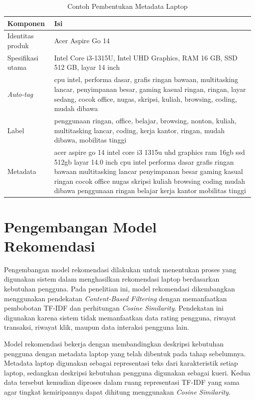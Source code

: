 \begin{table}[htbp]
\centering
\footnotesize
\caption{Contoh Pembentukan Metadata Laptop}
\label{tab:contoh_metadata_bab3}
\renewcommand{\arraystretch}{1.15}
\begin{tabular}{|p{4cm}|p{9cm}|}
\hline
\textbf{Komponen} & \textbf{Isi} \\ \hline
Identitas produk & Acer Aspire Go 14 \\ \hline
Spesifikasi utama & Intel Core i3-1315U, Intel UHD Graphics, RAM 16 GB, SSD 512 GB, layar 14 inch \\ \hline
\textit{Auto-tag} & cpu intel, performa dasar, grafis ringan bawaan, multitasking lancar, penyimpanan besar, gaming kasual ringan, ringan, layar sedang, cocok office, nugas, skripsi, kuliah, browsing, coding, mudah dibawa \\ \hline
Label & penggunaan ringan, office, belajar, browsing, nonton, kuliah, multitasking lancar, coding, kerja kantor, ringan, mudah dibawa, mobilitas tinggi \\ \hline
Metadata & acer aspire go 14 intel core i3 1315u uhd graphics ram 16gb ssd 512gb layar 14.0 inch cpu intel performa dasar grafis ringan bawaan multitasking lancar penyimpanan besar gaming kasual ringan cocok office nugas skripsi kuliah browsing coding mudah dibawa penggunaan ringan belajar kerja kantor mobilitas tinggi \\ \hline
\end{tabular}
\end{table}

\section{Pengembangan Model Rekomendasi}
Pengembangan model rekomendasi dilakukan untuk menentukan proses yang digunakan sistem dalam menghasilkan rekomendasi laptop berdasarkan kebutuhan pengguna. Pada penelitian ini, model rekomendasi dikembangkan menggunakan pendekatan \textit{Content-Based Filtering} dengan memanfaatkan pembobotan TF-IDF dan perhitungan \textit{Cosine Similarity}. Pendekatan ini digunakan karena sistem tidak memanfaatkan data rating pengguna, riwayat transaksi, riwayat klik, maupun data interaksi pengguna lain.

Model rekomendasi bekerja dengan membandingkan deskripsi kebutuhan pengguna dengan metadata laptop yang telah dibentuk pada tahap sebelumnya. Metadata laptop digunakan sebagai representasi teks dari karakteristik setiap laptop, sedangkan deskripsi kebutuhan pengguna digunakan sebagai kueri. Kedua data tersebut kemudian diproses dalam ruang representasi TF-IDF yang sama agar tingkat kemiripannya dapat dihitung menggunakan \textit{Cosine Similarity}.

